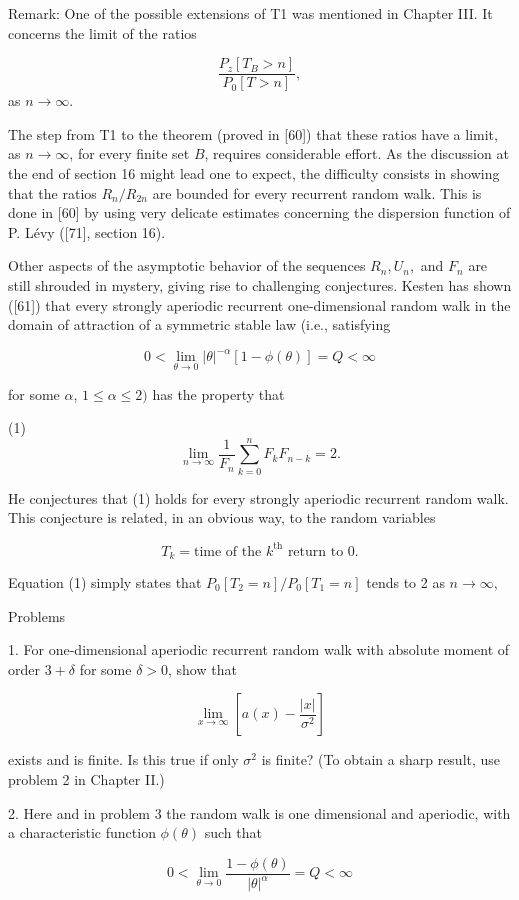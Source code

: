 Remark: One of the possible extensions of T1 was mentioned in Chapter III. It concerns the limit of the ratios

$$\frac{P_z[T_B > n]}{P_0[T > n]},$$ as $n \to \infty$.

The step from T1 to the theorem (proved in [60]) that these ratios have a limit, as $n \to \infty$, for every finite set $B$, requires considerable effort. As the discussion at the end of section 16 might lead one to expect, the difficulty consists in showing that the ratios $R_n/R_{2n}$ are bounded for every recurrent random walk. This is done in [60] by using very delicate estimates concerning the dispersion function of P. Lévy ([71], section 16).

Other aspects of the asymptotic behavior of the sequences $R_n, U_n,$ and $F_n$ are still shrouded in mystery, giving rise to challenging conjectures. Kesten has shown ([61]) that every strongly aperiodic recurrent one-dimensional random walk in the domain of attraction of a symmetric stable law (i.e., satisfying

$$0 < \lim_{\theta \to 0} |\theta|^{-\alpha}[1 - \phi(\theta)] = Q < \infty$$

for some $\alpha$, $1 \leq \alpha \leq 2)$ has the property that

(1) $$\lim_{n \to \infty} \frac{1}{F_n} \sum_{k=0}^{n} F_k F_{n-k} = 2.$$

He conjectures that (1) holds for every strongly aperiodic recurrent random walk. This conjecture is related, in an obvious way, to the random variables

$$T_k = \text{time of the } k^{\text{th}} \text{ return to } 0.$$

Equation (1) simply states that $P_0[T_2 = n] / P_0[T_1 = n]$ tends to 2 as $n \to \infty$,

Problems

1. For one-dimensional aperiodic recurrent random walk with absolute moment of order $3 + \delta$ for some $\delta > 0$, show that

$$\lim_{x \to \infty} \left[ a(x) - \frac{|x|}{\sigma^2} \right]$$

exists and is finite. Is this true if only $\sigma^2$ is finite? (To obtain a sharp result, use problem 2 in Chapter II.)

2. Here and in problem 3 the random walk is one dimensional and aperiodic, with a characteristic function $\phi(\theta)$ such that

$$0 < \lim_{\theta \to 0} \frac{1 - \phi(\theta)}{|\theta|^\alpha} = Q < \infty$$

